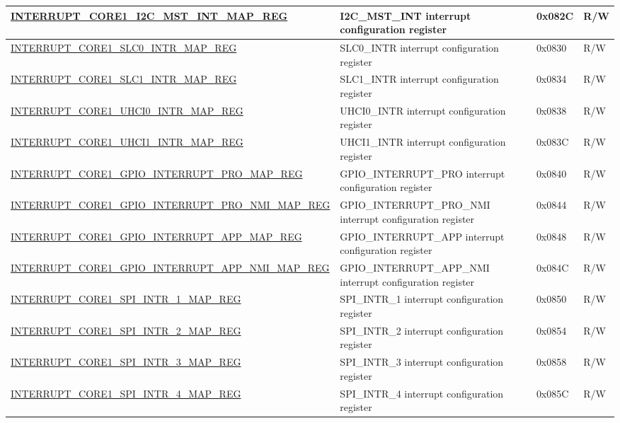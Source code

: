 \begin{landscape}
\begin{longtable}{ | p{10cm} | p{10.2cm} | p{1.3cm} | p{1cm} | }
\hyperref[regdesc:INTERRUPTCORE1I2CMSTINTMAPREG]{INTERRUPT\_CORE1\_I2C\_MST\_INT\_MAP\_REG} & I2C\_MST\_INT interrupt configuration register & 0x082C & R/W \\ \hline
\hyperref[regdesc:INTERRUPTCORE1SLC0INTRMAPREG]{INTERRUPT\_CORE1\_SLC0\_INTR\_MAP\_REG} & SLC0\_INTR interrupt configuration register & 0x0830 & R/W \\ \hline
\hyperref[regdesc:INTERRUPTCORE1SLC1INTRMAPREG]{INTERRUPT\_CORE1\_SLC1\_INTR\_MAP\_REG} & SLC1\_INTR interrupt configuration register & 0x0834 & R/W \\ \hline
\hyperref[regdesc:INTERRUPTCORE1UHCI0INTRMAPREG]{INTERRUPT\_CORE1\_UHCI0\_INTR\_MAP\_REG} & UHCI0\_INTR interrupt configuration register & 0x0838 & R/W \\ \hline
\hyperref[regdesc:INTERRUPTCORE1UHCI1INTRMAPREG]{INTERRUPT\_CORE1\_UHCI1\_INTR\_MAP\_REG} & UHCI1\_INTR interrupt configuration register & 0x083C & R/W \\ \hline
\hyperref[regdesc:INTERRUPTCORE1GPIOINTERRUPTPROMAPREG]{INTERRUPT\_CORE1\_GPIO\_INTERRUPT\_PRO\_MAP\_REG} & GPIO\_INTERRUPT\_PRO interrupt configuration register & 0x0840 & R/W \\ \hline
\hyperref[regdesc:INTERRUPTCORE1GPIOINTERRUPTPRONMIMAPREG]{INTERRUPT\_CORE1\_GPIO\_INTERRUPT\_PRO\_NMI\_MAP\_REG} & GPIO\_INTERRUPT\_PRO\_NMI interrupt configuration register & 0x0844 & R/W \\ \hline
\hyperref[regdesc:INTERRUPTCORE1GPIOINTERRUPTAPPMAPREG]{INTERRUPT\_CORE1\_GPIO\_INTERRUPT\_APP\_MAP\_REG} & GPIO\_INTERRUPT\_APP interrupt configuration register & 0x0848 & R/W \\ \hline
\hyperref[regdesc:INTERRUPTCORE1GPIOINTERRUPTAPPNMIMAPREG]{INTERRUPT\_CORE1\_GPIO\_INTERRUPT\_APP\_NMI\_MAP\_REG} & GPIO\_INTERRUPT\_APP\_NMI interrupt configuration register & 0x084C & R/W \\ \hline
\hyperref[regdesc:INTERRUPTCORE1SPIINTR1MAPREG]{INTERRUPT\_CORE1\_SPI\_INTR\_1\_MAP\_REG} & SPI\_INTR\_1 interrupt configuration register & 0x0850 & R/W \\ \hline
\hyperref[regdesc:INTERRUPTCORE1SPIINTR2MAPREG]{INTERRUPT\_CORE1\_SPI\_INTR\_2\_MAP\_REG} & SPI\_INTR\_2 interrupt configuration register & 0x0854 & R/W \\ \hline
\hyperref[regdesc:INTERRUPTCORE1SPIINTR3MAPREG]{INTERRUPT\_CORE1\_SPI\_INTR\_3\_MAP\_REG} & SPI\_INTR\_3 interrupt configuration register & 0x0858 & R/W \\ \hline
\hyperref[regdesc:INTERRUPTCORE1SPIINTR4MAPREG]{INTERRUPT\_CORE1\_SPI\_INTR\_4\_MAP\_REG} & SPI\_INTR\_4 interrupt configuration register & 0x085C & R/W \\ \hline

\end{longtable}
\end{landscape}
